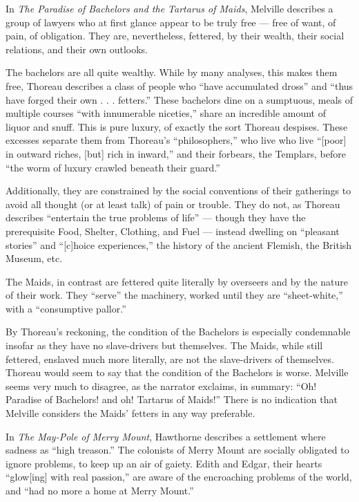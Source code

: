 \documentclass[man,12pt,natbib]{apa6}
\begin{document}
In \emph{The Paradise of Bachelors and the Tartarus of Maids}, Melville
describes a group of lawyers who at first glance appear to be truly free ---
free of want, of pain, of obligation. They are, nevertheless, fettered, by
their wealth, their social relations, and their own outlooks.

The bachelors are all quite wealthy. While by many analyses, this makes them
free, Thoreau describes a class of people who ``have accumulated dross'' and
``thus have forged their own . . . fetters.'' These bachelors dine on a
sumptuous, meals of multiple courses ``with innumerable niceties,'' share an
incredible amount of liquor and snuff. This is pure luxury, of exactly the sort
Thoreau despises.  These excesses separate them from Thoreau's
``philosophers,'' who live who live ``[poor] in outward riches, [but] rich in
inward,'' and their forbears, the Templars, before ``the worm of luxury crawled
beneath their guard.''

Additionally, they are constrained by the social conventions of their
gatherings to avoid all thought (or at least talk) of pain or trouble. They do
not, as Thoreau describes ``entertain the true problems of life'' --- though
they have the prerequisite Food, Shelter, Clothing, and Fuel --- instead
dwelling on ``pleasant stories'' and ``[c]hoice experiences,'' the history of
the ancient Flemish, the British Museum, etc. 

The Maids, in contrast are fettered quite literally by overseers and by the
nature of their work. They ``serve'' the machinery, worked until they are
``sheet-white,'' with a ``consumptive pallor.''

By Thoreau's reckoning, the condition of the Bachelors is especially
condemnable insofar as they have no slave-drivers but themselves. The Maids,
while still fettered, enslaved much more literally, are not the slave-drivers
of themselves.  Thoreau would seem to say that the condition of the Bachelors
is worse.  Melville seems very much to disagree, as the narrator exclaims, in
summary: ``Oh! Paradise of Bachelors! and oh! Tartarus of Maids!'' There is no
indication that Melville considers the Maids' fetters in any way preferable.

In \emph{The May-Pole of Merry Mount}, Hawthorne describes a settlement where
sadness as ``high treason.'' The colonists of Merry Mount are socially
obligated to ignore problems, to keep up an air of gaiety. Edith and Edgar,
their hearts ``glow[ing] with real passion,'' are aware of the encroaching
problems of the world, and ``had no more a home at Merry Mount.''
\end{document}
